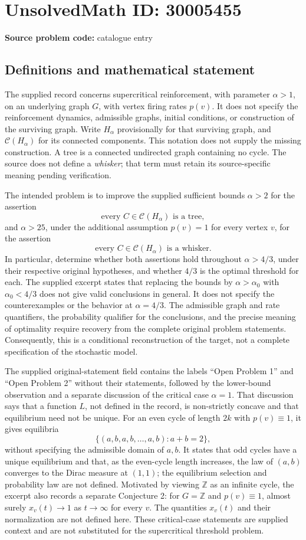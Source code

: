\documentclass[11pt]{article}
\newcommand{\Z}{\mathbb{Z}}
\begin{document}
\section*{UnsolvedMath ID: 30005455}
\textbf{Source problem code:} catalogue entry
\subsection{Definitions and mathematical statement}
The supplied record concerns supercritical reinforcement, with parameter \(\alpha>1\), on an underlying graph \(G\), with vertex firing rates \(p(v)\). It does not specify the reinforcement dynamics, admissible graphs, initial conditions, or construction of the surviving graph. Write \(H_\alpha\) provisionally for that surviving graph, and \(\mathcal C(H_\alpha)\) for its connected components. This notation does not supply the missing construction. A tree is a connected undirected graph containing no cycle. The source does not define a \emph{whisker}; that term must retain its source-specific meaning pending verification.

The intended problem is to improve the supplied sufficient bounds \(\alpha>2\) for the assertion
\[
\text{every }C\in\mathcal C(H_\alpha)\text{ is a tree},
\]
and \(\alpha>25\), under the additional assumption \(p(v)=1\) for every vertex \(v\), for the assertion
\[
\text{every }C\in\mathcal C(H_\alpha)\text{ is a whisker}.
\]
In particular, determine whether both assertions hold throughout \(\alpha>4/3\), under their respective original hypotheses, and whether \(4/3\) is the optimal threshold for each. The supplied excerpt states that replacing the bounds by \(\alpha>\alpha_0\) with \(\alpha_0<4/3\) does not give valid conclusions in general. It does not specify the counterexamples or the behavior at \(\alpha=4/3\). The admissible graph and rate quantifiers, the probability qualifier for the conclusions, and the precise meaning of optimality require recovery from the complete original problem statements. Consequently, this is a conditional reconstruction of the target, not a complete specification of the stochastic model.

The supplied original-statement field contains the labels ``Open Problem 1'' and ``Open Problem 2'' without their statements, followed by the lower-bound observation and a separate discussion of the critical case \(\alpha=1\). That discussion says that a function \(L\), not defined in the record, is non-strictly concave and that equilibrium need not be unique. For an even cycle of length \(2k\) with \(p(v)\equiv1\), it gives equilibria
\[
\{(a,b,a,b,\ldots,a,b):a+b=2\},
\]
without specifying the admissible domain of \(a,b\). It states that odd cycles have a unique equilibrium and that, as the even-cycle length increases, the law of \((a,b)\) converges to the Dirac measure at \((1,1)\); the equilibrium selection and probability law are not defined. Motivated by viewing \(\Z\) as an infinite cycle, the excerpt also records a separate Conjecture 2: for \(G=\Z\) and \(p(v)\equiv1\), almost surely \(x_v(t)\to1\) as \(t\to\infty\) for every \(v\). The quantities \(x_v(t)\) and their normalization are not defined here. These critical-case statements are supplied context and are not substituted for the supercritical threshold problem.
\end{document}
